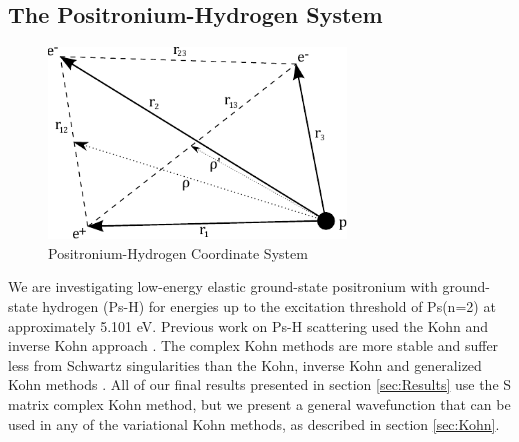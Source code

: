\documentclass[preprint,showpacs,preprintnumbers,amsmath,amssymb]{revtex4}
\begin{document}
\subsection{The Positronium-Hydrogen System}
\begin{figure}[!h]
	\centering
	\includegraphics[height=2in]{PsHCoordinates}
	\caption{Positronium-Hydrogen Coordinate System}
	\label{fig:PsHCoords}
\end{figure}

We are investigating low-energy elastic ground-state positronium with ground-state hydrogen (Ps-H) for energies up to the excitation threshold of Ps(n=2) at approximately 5.101 eV. Previous work on Ps-H scattering used the Kohn and inverse Kohn approach \cite{VanReeth2003, VanReeth2004}. The complex Kohn methods are more stable and suffer less from Schwartz singularities than the Kohn, inverse Kohn and generalized Kohn methods \cite{Cooper2010}. All of our final results presented in section \ref{sec:Results} use the S matrix complex Kohn method, but we present a general wavefunction that can be used in any of the variational Kohn methods, as described in section \ref{sec:Kohn}.
\end{document}
